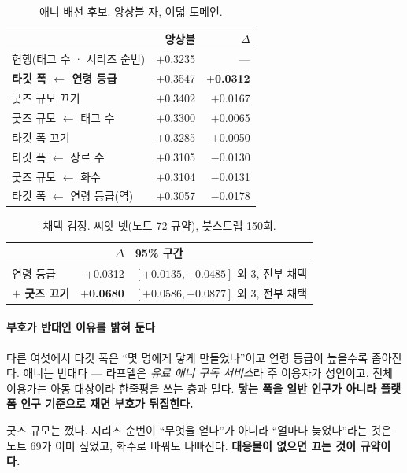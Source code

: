 \documentclass[10pt]{article}
\begin{document}
\begin{table}[t]
\centering\tsize
\caption{애니 배선 후보. 앙상블 자, 여덟 도메인.}
\begin{tabular}{lrr}
\toprule
& 앙상블 & $\Delta$ \\
\midrule
현행(태그 수 · 시리즈 순번) & $+$0.3235 & --- \\
\textbf{타깃 폭 $\leftarrow$ 연령 등급} & $+$0.3547 & \textbf{$+$0.0312} \\
굿즈 규모 끄기 & $+$0.3402 & $+$0.0167 \\
굿즈 규모 $\leftarrow$ 태그 수 & $+$0.3300 & $+$0.0065 \\
타깃 폭 끄기 & $+$0.3285 & $+$0.0050 \\
타깃 폭 $\leftarrow$ 장르 수 & $+$0.3105 & $-$0.0130 \\
굿즈 규모 $\leftarrow$ 화수 & $+$0.3104 & $-$0.0131 \\
타깃 폭 $\leftarrow$ 연령 등급(역) & $+$0.3057 & $-$0.0178 \\
\bottomrule
\end{tabular}
\end{table}

\begin{table}[t]
\centering\tsize
\caption{채택 검정. 씨앗 넷(노트 72 규약), 붓스트랩 150회.}
\begin{tabular}{lrl}
\toprule
& $\Delta$ & 95\% 구간 \\
\midrule
연령 등급 & $+$0.0312 & $[+0.0135, +0.0485]$ 외 3, 전부 채택 \\
\textbf{$+$ 굿즈 끄기} & \textbf{$+$0.0680} & $[+0.0586, +0.0877]$ 외 3, 전부 채택 \\
\bottomrule
\end{tabular}
\end{table}

\paragraph{부호가 반대인 이유를 밝혀 둔다}
다른 여섯에서 타깃 폭은 ``몇 명에게 닿게 만들었나''이고 연령 등급이 높을수록
좁아진다. 애니는 반대다 --- 라프텔은 \emph{유료 애니 구독 서비스}라 주 이용자가
성인이고, 전체 이용가는 아동 대상이라 한줄평을 쓰는 층과 멀다. \textbf{닿는
폭을 일반 인구가 아니라 플랫폼 인구 기준으로 재면 부호가 뒤집힌다.}

굿즈 규모는 껐다. 시리즈 순번이 ``무엇을 얻나''가 아니라 ``얼마나 늦었나''라는
것은 노트 69가 이미 짚었고, 화수로 바꿔도 나빠진다. \textbf{대응물이 없으면
끄는 것이 규약이다.}
\end{document}
